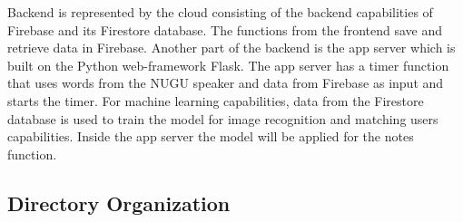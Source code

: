 \documentclass[conference]{IEEEtran}
\begin{document}
Backend is represented by the cloud consisting of the backend capabilities of Firebase and its Firestore database. The functions from the frontend save and retrieve data in Firebase. Another part of the backend is the app server which is built on the Python web-framework Flask. The app server has a timer function that uses words from the NUGU speaker and data from Firebase as input and starts the timer. For machine learning capabilities, data from the Firestore database is used to train the model for image recognition and matching users capabilities. Inside the app server the model will be applied for the notes function.


\subsection{Directory Organization}
\end{document}
